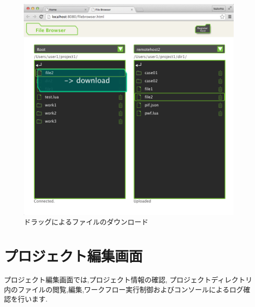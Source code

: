 \documentclass[a4paper,10pt,oneside]{jsbook}
\begin{document}
\begin{figure}[H]
	\begin{center}
		\includegraphics[width=12.0cm]{image/filebrowser_010.png}
	\end{center}
	\caption{ドラッグによるファイルのダウンロード}
	\label{fig:filebrowser_filedownload}
\end{figure}

\newpage

\chapter{プロジェクト編集画面}
\label{chap:projeditor}
プロジェクト編集画面では,プロジェクト情報の確認, プロジェクトディレクトリ内のファイルの閲覧,編集,ワークフロー実行制御およびコンソールによるログ確認を行います.
\end{document}
